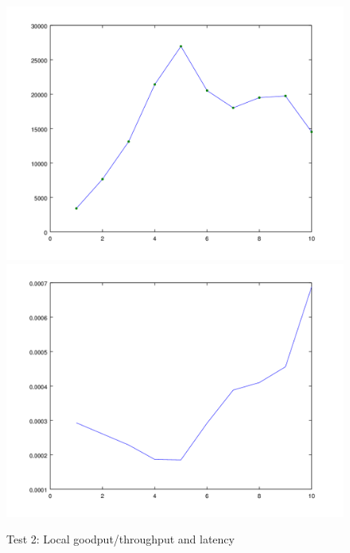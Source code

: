 \documentclass{article}      %
\begin{document}
\begin{figure}[ht]
\centering
 \includegraphics[scale=.33]{graphs/graph3-goodput}
 \includegraphics[scale=.33]{graphs/graph3-latency}
\caption{Test 2: Local goodput/throughput and latency \label{overflow}}
\end{figure}
\end{document}
